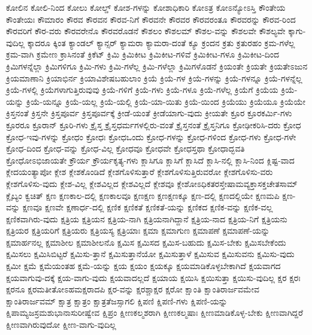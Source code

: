 {ಕೋಲಿನ
ಕೋಲಿ-ನಿಂದ
ಕೋಲು
ಕೋಲ್ಡ್
ಕೋಶ-ಗಳನ್ನು
ಕೋಶಾಧಿಕಾರಿ
ಕೋಽತ್ರ
ಕೋಽನ್ಯೋಽಸ್ತಿ
ಕೌಂತೇಯ
ಕೌಂತೇಯಃ
ಕೌಮಾರಂ
ಕೌರವ
ಕೌರವನ
ಕೌರವ-ನಿಗೆ
ಕೌರವನೇ
ಕೌರವರ
ಕೌರವರಂತೂ
ಕೌರವರನ್ನು
ಕೌರವ-ರಿಂದ
ಕೌರವರಿಗೆ
ಕೌರ-ವರು
ಕೌರವರೇನೊ
ಕೌರವರೊಡನೆ
ಕೌಶಲಂ
ಕೌಶಲಮ್
ಕೌಶಲ-ವನ್ನು
ಕೌಶಲವೇ
ಕೌಶಲ್ಯವೇ
ಕ್ಕಾಗು-ವುದಿಲ್ಲ
ಕ್ಕಾದರೂ
ಕ್ಕಿಂತ
ಕ್ಯಾಂಡಲ್
ಕ್ಯಾನ್ಸರ್
ಕ್ಯಾಮರಾ
ಕ್ಯಾಮರಾ-ದಂತೆ
ಕ್ಯೂ
ಕ್ರಂದನ
ಕ್ರತು
ಕ್ರತುರಹಂ
ಕ್ರಮ-ಗಳೆಲ್ಲ
ಕ್ರಮ-ವಾಗಿ
ಕ್ರಮೇಣ
ಕ್ರಾಸಿನಂತೆ
ಕ್ರಿಕೆಟ್
ಕ್ರಿಮಿ
ಕ್ರಿಮಿಕೀಟ
ಕ್ರಿಮಿಕೀಟ-ಗಳಿವೆ
ಕ್ರಿಮಿಕೀಟ-ಗಳೂ
ಕ್ರಿಮಿಕೀಟ-ದಿಂದ
ಕ್ರಿಮಿಗಳನ್ನೆಲ್ಲಾ
ಕ್ರಿಮಿಗಳಿಗೂ
ಕ್ರಿಮಿ-ಗಳು
ಕ್ರಿಮಿ-ಗಳೆಲ್ಲ
ಕ್ರಿಮಿ-ಗಳೆಲ್ಲಾ
ಕ್ರಿಮಿಗಳೊಡನೆ
ಕ್ರಿಯಂತೇ
ಕ್ರಿಯತೇ
ಕ್ರಿಯತೇಽಜುನ
ಕ್ರಿಯಮಾಣಾನಿ
ಕ್ರಿಯಾಭಿರ್ನ
ಕ್ರಿಯಾವಿಶೇಷಬಹುಲಾಂ
ಕ್ರಿಯೆ
ಕ್ರಿಯೆ-ಗಳ
ಕ್ರಿಯೆ-ಗಳನ್ನು
ಕ್ರಿಯೆ-ಗಳನ್ನೂ
ಕ್ರಿಯೆ-ಗಳನ್ನೆಲ್ಲ
ಕ್ರಿಯೆ-ಗಳಲ್ಲಿ
ಕ್ರಿಯೆಗಳಾಗುತ್ತಿರುವುವು
ಕ್ರಿಯೆ-ಗಳಿಗೆ
ಕ್ರಿಯೆ-ಗಳು
ಕ್ರಿಯೆ-ಗಳೂ
ಕ್ರಿಯೆ-ಗಳೆಲ್ಲ
ಕ್ರಿಯೆಗೆ
ಕ್ರಿಯೆಯ
ಕ್ರಿಯೆ-ಯನ್ನು
ಕ್ರಿಯೆ-ಯನ್ನೂ
ಕ್ರಿಯೆ-ಯಲ್ಲ
ಕ್ರಿಯೆ-ಯಲ್ಲಿ
ಕ್ರಿಯೆ-ಯಾ-ಯಿತು
ಕ್ರಿಯೆ-ಯಿಂದ
ಕ್ರಿಯೆಯು
ಕ್ರಿಯೆಯೂ
ಕ್ರಿಯೆಯೇ
ಕ್ರಿಸ್ತನಂತೆ
ಕ್ರಿಸ್ತನೇ
ಕ್ರಿಸ್ತಪೂರ್ವ
ಕ್ರಿಸ್ತಪೂರ್ವಕ್ಕೆ
ಕ್ರೀಡೆ-ಯಂತೆ
ಕ್ರೀಡೆಯಾಗು-ವುದು
ಕ್ರೀಯತೇ
ಕ್ರೂರ
ಕ್ರೂರಕರ್ಮಿ-ಗಳು
ಕ್ರೂರರೂ
ಕ್ರೂರಾನ್
ಕ್ರೂರಿ-ಗಳು
ಕ್ರೈಸ್ತ
ಕ್ರೈಸ್ತಧರ್ಮಗಳಲ್ಲಿರು-ವಂತೆ
ಕ್ರೈಸ್ತನಂತೆ
ಕ್ರೈಸ್ತನಿಗೂ
ಕ್ರೋಢೀಕರಿಸಿ-ದರು
ಕ್ರೋಧ
ಕ್ರೋಧ-ಇವು-ಗಳನ್ನು
ಕ್ರೋಧಂ
ಕ್ರೋಧಃ
ಕ್ರೋಧಒಂದು
ಕ್ರೋಧ-ಗಳನ್ನು
ಕ್ರೋಧ-ಗಳಿಂದ
ಕ್ರೋಧ-ಗಳು
ಕ್ರೋಧ-ಗಳೇ
ಕ್ರೋಧ-ದಿಂದ
ಕ್ರೋಧ-ವನ್ನು
ಕ್ರೋಧ-ವಿಲ್ಲ
ಕ್ರೋಧವೂ
ಕ್ರೋಧವೇ
ಕ್ರೋಧಸ್ತಥಾ
ಕ್ರೋಧಾದ್ಭವತಿ
ಕ್ರೋಧೋಽಭಿಜಾಯತೇ
ಕ್ರೌರ್ಯ
ಕ್ರೌರ್ಯಕೃತ್ಯ-ಗಳು
ಕ್ಲಾಸಿಗೂ
ಕ್ಲಾಸಿಗೆ
ಕ್ಲಾಸಿದೆ
ಕ್ಲಾಸಿ-ನಲ್ಲಿ
ಕ್ಲಾಸಿ-ನಿಂದ
ಕ್ಲಿಷ್ಟ-ವಾದ
ಕ್ಲೇದಯಂತ್ಯಾಪೋ
ಕ್ಲೇಶ
ಕ್ಲೇಶಕೊಂಡಿದೆ
ಕ್ಲೇಶಗೊಳಿಸುತ್ತಾರೆ
ಕ್ಲೇಶಗೊಳಿಸುತ್ತಿರುವರೋ
ಕ್ಲೇಶಗೊಳಿಸು-ವರು
ಕ್ಲೇಶಗೊಳಿಸು-ವುದು
ಕ್ಲೇಶ-ವಿಲ್ಲ
ಕ್ಲೇಶವಿಲ್ಲದ
ಕ್ಲೇಶವಿಲ್ಲದೆ
ಕ್ಲೇಶವೂ
ಕ್ಲೇಶೋಽಧಿಕತರಸ್ತೇಷಾಮವ್ಯಕ್ತಾಸಕ್ತಚೇತಸಾಮ್
ಕ್ಲೈಬ್ಯಂ
ಕ್ವಚಿತ್
ಕ್ಷಣ
ಕ್ಷಣಕಾಲ-ದಲ್ಲಿ
ಕ್ಷಣಕಾಲವೂ
ಕ್ಷಣಕ್ಷಣ
ಕ್ಷಣಕ್ಷಣಕ್ಕೂ
ಕ್ಷಣ-ದಲ್ಲಿ
ಕ್ಷಣದಲ್ಲಿಯೇ
ಕ್ಷಣಮಪಿ
ಕ್ಷಣ-ವನ್ನು
ಕ್ಷಣವೂ
ಕ್ಷಣವೇ
ಕ್ಷಣಾರ್ಧ-ದಲ್ಲಿ
ಕ್ಷಣಿಕ
ಕ್ಷಣಿಕತೆ
ಕ್ಷಣಿಕತೆ-ಯನ್ನು
ಕ್ಷಣಿಕದ
ಕ್ಷಣಿಕ-ವನ್ನು
ಕ್ಷಣಿಕ-ವಲ್ಲ
ಕ್ಷಣಿಕವಾಗಿರು-ವುದು
ಕ್ಷತ್ರಿಯ
ಕ್ಷತ್ರಿಯನ
ಕ್ಷತ್ರಿಯ-ನಾಗಿ
ಕ್ಷತ್ರಿಯನಾಗಿದ್ದಾನೆ
ಕ್ಷತ್ರಿಯ-ನಾದ
ಕ್ಷತ್ರಿಯ-ನಿಗೆ
ಕ್ಷತ್ರಿಯನು
ಕ್ಷತ್ರಿಯರ
ಕ್ಷತ್ರಿಯರಿಗೆ
ಕ್ಷತ್ರಿಯರು
ಕ್ಷತ್ರಿಯಸ್ಯ
ಕ್ಷತ್ರಿಯಾಃ
ಕ್ಷಮಾ
ಕ್ಷಮಾಗುಣ
ಕ್ಷಮಾಪಣೆ
ಕ್ಷಮಾಪಣೆ-ಯನ್ನು
ಕ್ಷಮಾರ್ಹನಲ್ಲ
ಕ್ಷಮಾಶೀಲ
ಕ್ಷಮಾಶೀಲನೊ
ಕ್ಷಮಿಸ
ಕ್ಷಮಿಸದ
ಕ್ಷಮಿಸ-ಬಹುದು
ಕ್ಷಮಿಸ-ಬೇಕು
ಕ್ಷಮಿಸಬೇಕೆಂದು
ಕ್ಷಮಿಸಲು
ಕ್ಷಮಿಸಿಬಿಟ್ಟರೆ
ಕ್ಷಮಿಸು-ತ್ತಾನೆ
ಕ್ಷಮಿಸುತ್ತಾನೆಯೋ
ಕ್ಷಮಿಸುತ್ತಾಳೆ
ಕ್ಷಮಿಸುವ
ಕ್ಷಮಿಸುವನು
ಕ್ಷಮಿಸು-ವುದು
ಕ್ಷಮೀ
ಕ್ಷಮೆ
ಕ್ಷಮೆಯಂತಹ
ಕ್ಷಮೆ-ಯನ್ನು
ಕ್ಷಯ
ಕ್ಷಯಂ
ಕ್ಷಯಕ್ಕೂ
ಕ್ಷಯಮಾಡಿಕೊಳ್ಳಬೇಕಾಗಿದೆ
ಕ್ಷಯವಾಗದ
ಕ್ಷಯವಾಗುವು-ದಕ್ಕೆ
ಕ್ಷಯ-ವಾಗು-ವುದು
ಕ್ಷಯವಾದಲ್ಲದೆ
ಕ್ಷಯಾಯ
ಕ್ಷಯಿಸಿ
ಕ್ಷಯಿಸುತ್ತಾ
ಕ್ಷಯಿಸು-ವುದಿಲ್ಲ
ಕ್ಷರ
ಕ್ಷರಃ
ಕ್ಷರನೂ
ಕ್ಷರಮತೀತೋಽಹಮಕ್ಷರಾದಪಿ
ಕ್ಷರ-ವನ್ನು
ಕ್ಷರಶ್ಚಾಕ್ಷರ
ಕ್ಷರೋ
ಕ್ಷಾಂತಿ
ಕ್ಷಾಂತಿರಾರ್ಜವಮೇವ
ಕ್ಷಾಂತಿರಾರ್ಜವಮ್
ಕ್ಷಾತ್ರ
ಕ್ಷಾತ್ರಂ
ಕ್ಷಾತ್ರತೆಜಸ್ಸಾಗಲಿ
ಕ್ಷಿಪಣಿ
ಕ್ಷಿಪಣಿ-ಗಳು
ಕ್ಷಿಪಣಿ-ಯನ್ನು
ಕ್ಷಿಪಾಮ್ಯಜಸ್ರಮಶುಭಾನಾಸುರೀಷ್ವೇವ
ಕ್ಷಿಪ್ರಂ
ಕ್ಷೀಣಕಲ್ಮಶರಾಗಿ
ಕ್ಷೀಣಕಲ್ಮಷಾಃ
ಕ್ಷೀಣಮಾಡಿಕೊಳ್ಳ-ಬೇಕು
ಕ್ಷೀಣವಾಗಿದ್ದರೆ
ಕ್ಷೀಣವಾಗಿರುವುದೋ
ಕ್ಷೀಣ-ವಾಗು-ವುದಿಲ್ಲ
}
